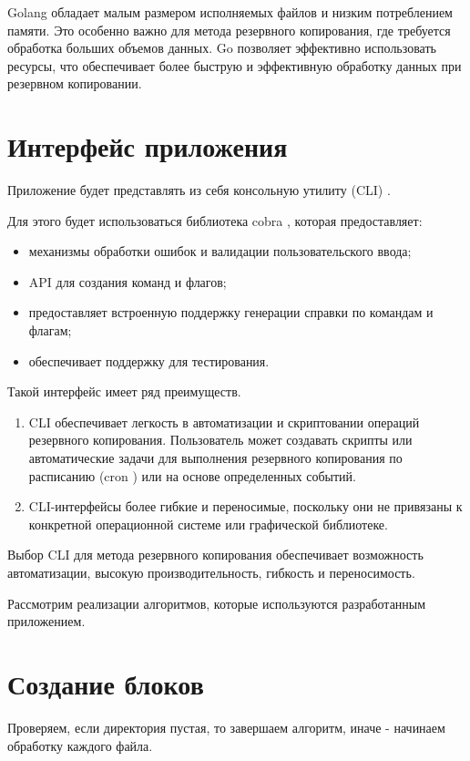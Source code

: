 Golang обладает малым размером исполняемых файлов и низким потреблением памяти. Это особенно важно для метода резервного копирования, где требуется обработка больших объемов данных. Go позволяет эффективно использовать ресурсы, что обеспечивает более быструю и эффективную обработку данных при резервном копировании.
\newpage
\section{Интерфейс приложения}

Приложение будет представлять из себя консольную утилиту (CLI) \cite{cli}.

Для этого будет использоваться библиотека cobra \cite{cobra}, которая предоставляет:
\begin{itemize}
\item механизмы обработки ошибок и валидации пользовательского ввода;
\item API для создания команд и флагов;
\item предоставляет встроенную поддержку генерации справки по командам и флагам;
\item обеспечивает поддержку для тестирования.
\end{itemize}

\begin{flushleft}
Такой интерфейс имеет ряд преимуществ.
\end{flushleft}

\begin{enumerate}
\item CLI обеспечивает легкость в автоматизации и скриптовании операций резервного копирования. Пользователь может создавать скрипты или автоматические задачи для выполнения резервного копирования по расписанию (cron \cite{cron}) или на основе определенных событий.

\item CLI-интерфейсы более гибкие и переносимые, поскольку они не привязаны к конкретной операционной системе или графической библиотеке.

\end{enumerate}

Выбор CLI для метода резервного копирования обеспечивает возможность автоматизации, высокую производительность, гибкость и переносимость.


Рассмотрим реализации алгоритмов, которые используются разработанным приложением.  

\newpage
\section{Создание блоков}
Проверяем, если директория пустая, то завершаем алгоритм, иначе - начинаем обработку каждого файла.  

